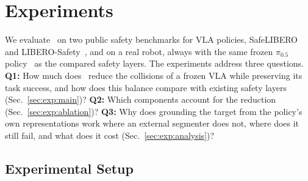 \section{Experiments}
\label{sec:experiments}

We evaluate \sys\ on two public safety benchmarks for VLA policies, SafeLIBERO~\cite{hu2026vlsa} and LIBERO-Safety~\cite{cui2026liberosafety}, and on a real robot, always with the same frozen $\pi_{0.5}$ policy~\cite{intelligence2025pi05} as the compared safety layers. The experiments address three questions. \textbf{Q1:} How much does \sys\ reduce the collisions of a frozen VLA while preserving its task success, and how does this balance compare with existing safety layers (Sec.~\ref{sec:exp:main})? \textbf{Q2:} Which components account for the reduction (Sec.~\ref{sec:exp:ablation})? \textbf{Q3:} Why does grounding the target from the policy's own representations work where an external segmenter does not, where does it still fail, and what does it cost (Sec.~\ref{sec:exp:analysis})?

\subsection{Experimental Setup}
\label{sec:exp:setup}

